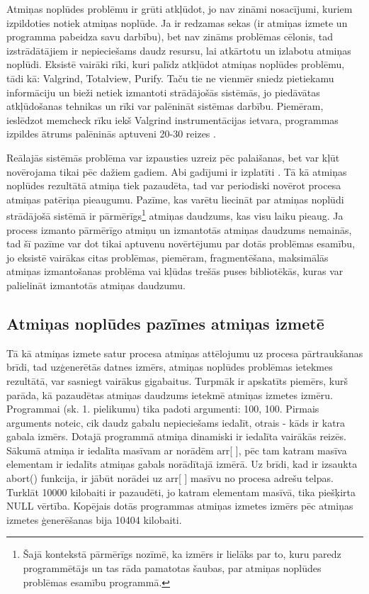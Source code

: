 Atmiņas noplūdes problēmu ir grūti atkļūdot,  jo nav zināmi nosacījumi, kuriem izpildoties notiek atmiņas noplūde. 
Ja ir redzamas sekas (ir atmiņas izmete un programma pabeidza savu darbību), bet nav zināms problēmas cēlonis, tad izstrādātājiem ir nepieciešams daudz resursu, lai atkārtotu un izlabotu atmiņas noplūdi. 
Eksistē vairāki rīki, kuri palīdz atkļūdot atmiņas noplūdes problēmu, tādi kā: Valgrind, Totalview, Purify. 
Taču tie ne vienmēr sniedz pietiekamu informāciju un bieži netiek izmantoti strādājošās sistēmās, jo piedāvātas atkļūdošanas tehnikas un rīki var palēnināt sistēmas darbību.
Piemēram, ieslēdzot  memcheck rīku iekš Valgrind instrumentācijas ietvara, programmas izpildes ātrums palēninās aptuveni 20-30 reizes \cite{UVD}.

Reālajās sistēmās problēma var izpausties uzreiz pēc palaišanas, bet var kļūt novērojama tikai pēc dažiem gadiem. 
Abi gadījumi ir izplatīti \cite{HTTM}.
Tā kā atmiņas noplūdes rezultātā atmiņa tiek pazaudēta, tad var periodiski novērot procesa atmiņas patēriņa pieaugumu.
Pazīme, kas varētu liecināt par atmiņas noplūdi strādājošā sistēmā ir pārmērīgs\footnote{Šajā kontekstā pārmērīgs nozīmē, ka izmērs ir lielāks par to, kuru paredz programmētājs un tas rāda pamatotas šaubas, par atmiņas noplūdes problēmas esamību programmā.}
atmiņas daudzums, kas visu laiku pieaug. 
Ja process izmanto pārmērīgo atmiņu un izmantotās atmiņas daudzums nemainās, tad šī pazīme var dot tikai aptuvenu novērtējumu par dotās problēmas esamību, jo eksistē vairākas citas problēmas, piemēram, fragmentēšana, maksimālās atmiņas izmantošanas problēma vai kļūdas trešās puses bibliotēkās, kuras var palielināt izmantotās atmiņas daudzumu.

\subsection{Atmiņas noplūdes pazīmes atmiņas izmetē}
Tā kā atmiņas izmete satur procesa atmiņas attēlojumu uz procesa pārtraukšanas brīdi, tad uzģenerētās datnes izmērs, atmiņas noplūdes problēmas ietekmes rezultātā, var sasniegt vairākus gigabaitus.
Turpmāk ir apskatīts piemērs, kurš parāda, kā pazaudētas atmiņas daudzums ietekmē atmiņas izmetes izmēru.
Programmai (sk. 1. pielikumu) tika padoti argumenti: 100, 100. 
Pirmais arguments noteic, cik daudz gabalu nepieciešams iedalīt, otrais - kāds ir katra gabala izmērs.
Dotajā programmā atmiņa dinamiski ir iedalīta vairākās reizēs. 
Sākumā atmiņa ir iedalīta masīvam ar norādēm arr[ ], pēc tam katram masīva elementam ir iedalīts atmiņas gabals norādītajā izmērā.
Uz brīdi, kad ir izsaukta abort() funkcija, ir jābūt norādei uz arr[ ] masīvu no procesa adrešu telpas.
Turklāt 10000 kilobaiti ir pazaudēti, jo  katram elementam masīvā, tika piešķirta NULL vērtība. 
Kopējais dotās programmas atmiņas izmetes izmērs pēc atmiņas izmetes ģenerēšanas bija 10404 kilobaiti.

